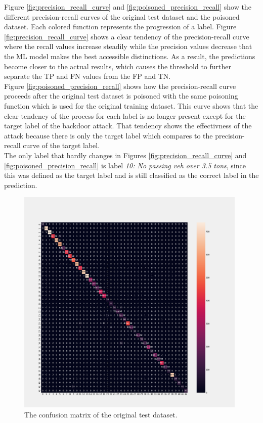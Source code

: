 Figure \ref{fig:precision_recall_curve} and \ref{fig:poisoned_precision_recall} show the different precision-recall curves of the original test dataset and the poisoned dataset. Each colored function represents the progression of a label. Figure \ref{fig:precision_recall_curve} shows a clear tendency of the precision-recall curve where the recall values increase steadily while the precision values decrease that the ML model makes the best accessible distinctions. As a result, the predictions become closer to the actual results, which causes the threshold to further separate the TP and FN values from the FP and TN. \\
Figure \ref{fig:poisoned_precision_recall} shows how the precision-recall curve proceeds after the original test dataset is poisoned with the same poisoning function which is used for the original training dataset. This curve shows that the clear tendency of the process for each label is no longer present except for the target label of the backdoor attack. That tendency shows the effectivness of the attack because there is only the target label which compares to the precision-recall curve of the target label. \\
The only label that hardly changes in Figures \ref{fig:precision_recall_curve} and \ref{fig:poisoned_precision_recall} is label \textit{10: No passing veh over 3.5 tons}, since this was defined as the target label and is still classified as the correct label in the prediction.

\begin{figure}[ht!]
  \centering
  \includegraphics[width=11cm]{pictures/cm_original_testdata.png}
  \caption{The confusion matrix of the original test dataset.}
  \label{fig:cm_original_testdata}
\end{figure}

